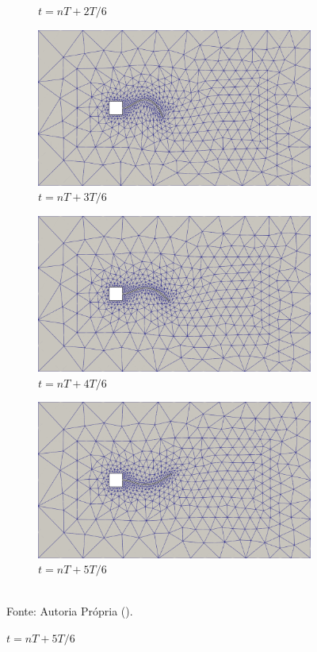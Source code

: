 \begin{figure}[h!]
\begin{subfigure}[b]{0.49\textwidth}
        \caption{$t=nT+2T/6$}
    \end{subfigure}
    \begin{subfigure}[b]{0.49\textwidth}
        \includegraphics[width=\linewidth]{Figuras/FSI-prism/mT4.png}
        \caption{$t=nT+3T/6$}
    \end{subfigure}
    \begin{subfigure}[b]{0.49\textwidth}
        \includegraphics[width=\linewidth]{Figuras/FSI-prism/mT5.png}
        \caption{$t=nT+4T/6$}
    \end{subfigure}
    \begin{subfigure}[b]{0.49\textwidth}
        \includegraphics[width=\linewidth]{Figuras/FSI-prism/mT6.png}
        \caption{$t=nT+5T/6$}
    \end{subfigure}
    \\Fonte: Autoria Própria (\the\year).
    \label{fig:prismMesh}
\end{figure}

